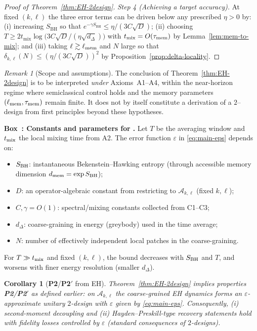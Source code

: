 \documentclass[11pt,a4paper]{article}
\newcommand{\Ptwo}{\textbf{P2}\xspace}
\newcommand{\PtwoPrime}{\textbf{P2$'$}\xspace}
\newcounter{boxedresult}
\newenvironment{boxedresult}[1]{\refstepcounter{boxedresult}\begin{infobox}\noindent\textbf{Box~\theboxedresult: #1.}}{\end{infobox}}
\theoremstyle{plain}
\newtheorem{corollary}[theorem]{Corollary}
\theoremstyle{definition}
\theoremstyle{remark}
\newtheorem{remark}[theorem]{Remark}
\begin{document}
\begin{proof}[Proof of Theorem~\ref{thm:EH-2design}]
\emph{Step 4 (Achieving a target accuracy).} At fixed $(k,\ell)$ the three error terms can be driven below any prescribed $\eta>0$ by:
(i) increasing $S_{\mathrm{BH}}$ so that $e^{-\gamma S_{\mathrm{BH}}}\le \eta/(3C\sqrt{D})$;
(ii) choosing $T\ge 2 t_{\mathrm{mix}}\log\!\big(3C\sqrt{D}/(\eta\sqrt{d_\Delta})\big)$ with $t_{\mathrm{mix}}=O(\tau_{\rm mem})$ by Lemma~\ref{lem:mem-to-mix};
and (iii) taking $\ell\gtrsim \ell_{\rm mem}$ and $N$ large so that $\delta_{k,\ell}(N)\le (\eta/(3C\sqrt{D}))^2$ by Proposition~\ref{prop:delta-locality}.
\end{proof}
\begin{remark}[Scope and assumptions]
The conclusion of Theorem~\ref{thm:EH-2design} is to be interpreted \emph{under} Axioms~A1--A4, within the near-horizon regime where semiclassical control holds and the memory parameters $(\ell_{\rm mem},\tau_{\rm mem})$ remain finite. It does not by itself constitute a derivation of a $2$--design from first principles beyond these hypotheses.
\end{remark}

\begin{boxedresult}{Constants and parameters for \Cref{thm:EH-2design}}\label{box:constants-eps-eh2}
Let $T$ be the averaging window and $t_{\rm mix}$ the local mixing time from A2. The error function $\varepsilon$ in \eqref{eq:main-eps} depends on:
\begin{itemize}[leftmargin=*,itemsep=0.2em]
  \item $S_{\rm BH}$: instantaneous Bekenstein--Hawking entropy (through accessible memory dimension $d_{\rm mem}=\exp S_{\rm BH}$);
  \item $D$: an operator-algebraic constant from restricting to $\mathscr{A}_{k,\ell}$ (fixed $k,\ell$);
  \item $C,\gamma = O(1)$: spectral/mixing constants collected from C1--C3;
  \item $d_\Delta$: coarse-graining in energy (greybody) used in the time average;
  \item $N$: number of effectively independent local patches in the coarse-graining.
\end{itemize}
For $T\gg t_{\rm mix}$ and fixed $(k,\ell)$, the bound decreases with $S_{\rm BH}$ and $T$, and worsens with finer energy resolution (smaller $d_\Delta$).
\end{boxedresult}

\begin{corollary}[\Ptwo/\PtwoPrime{} from EH]\label{cor:P2P2prime}
Theorem~\ref{thm:EH-2design} implies properties \Ptwo/\PtwoPrime{} as defined earlier: on $\mathscr{A}_{k,\ell}$ the coarse-grained EH dynamics forms an $\varepsilon$-approximate unitary $2$-design with $\varepsilon$ given by \eqref{eq:main-eps}.  Consequently, (i) second-moment decoupling and (ii) Hayden--Preskill-type recovery statements hold with fidelity losses controlled by $\varepsilon$ (standard consequences of $2$-designs).
\end{corollary}
\end{document}

